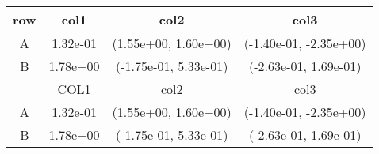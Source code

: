 \begin{tabular}{cccc}
\toprule
row&col1&col2&col3\tabularnewline
\midrule
A&1.32e-01& (1.55e+00, 1.60e+00)& (-1.40e-01, -2.35e+00)\tabularnewline
B&1.78e+00& (-1.75e-01, 5.33e-01)& (-2.63e-01, 1.69e-01)\tabularnewline
\midrule
&COL1&col2&col3\tabularnewline
\midrule
A&1.32e-01& (1.55e+00, 1.60e+00)& (-1.40e-01, -2.35e+00)\tabularnewline
B&1.78e+00& (-1.75e-01, 5.33e-01)& (-2.63e-01, 1.69e-01)\tabularnewline
\bottomrule
\end{tabular}
